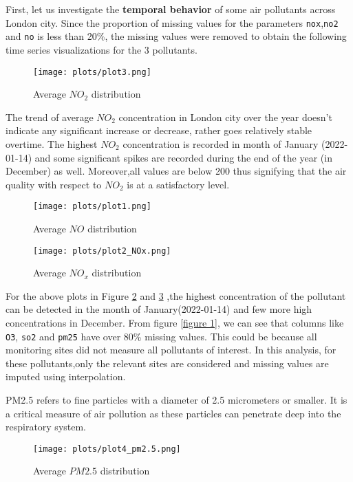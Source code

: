 \documentclass[]{article}
\begin{document}
First, let us investigate  the \textbf{temporal behavior} of some air pollutants  across London city.
\newline\newline
Since the proportion of missing values for the parameters \texttt{nox},\texttt{no2} and \texttt{no} is less than 20\%, the missing values were removed to obtain the following time series visualizations for the 3 pollutants.

\begin{figure}[H]
	\centering
	\texttt{[image: plots/plot3.png]}	
	\caption{Average $NO_2$ distribution}
	\label{plot 3}
\end{figure}


The trend of average $NO_2$ concentration in London city over the year doesn't indicate any significant increase or decrease, rather goes relatively stable overtime.
The highest $NO_2$ concentration is recorded in month of January (2022-01-14) and some significant spikes  are recorded during the end of the year (in December) as well.
Moreover,all values are below 200 thus signifying that the air quality with respect to  $NO_2$ is at a satisfactory level.

\begin{figure}[H]
	\centering
	\texttt{[image: plots/plot1.png]}	
	\caption{Average $NO$ distribution}
	\label{plot 1}
\end{figure}


\begin{figure}[H]
	\centering
	\texttt{[image: plots/plot2\_NOx.png]}	
	\caption{Average $NO_x$ distribution}
	\label{plot 2}
\end{figure}

For the above plots in Figure \ref{plot 1} and \ref{plot 2} ,the highest concentration of the pollutant can be detected in the month of January(2022-01-14) and few more high concentrations in December.
\newline
\newline
From figure \ref{figure 1}, we can see that columns like \texttt{O3}, \texttt{so2} and \texttt{pm25} have over 80\% missing values. This could be because all monitoring sites did not measure all pollutants of interest. In this analysis, for these pollutants,only the relevant sites are considered and missing values are imputed using interpolation.
\newline


PM2.5 refers to fine particles with a diameter of 2.5 micrometers or smaller. It is a critical measure of air pollution as these particles can penetrate deep into the respiratory system. 
\begin{figure}[H]
	\centering
	\texttt{[image: plots/plot4\_pm2.5.png]}	
	\caption{Average $PM2.5$ distribution}
	\label{plot 4}
\end{figure}
\end{document}
